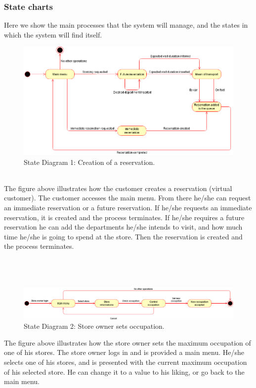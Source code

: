 \subsubsection{State charts}
Here we show the main processes that the system will manage, and the states in which the system will find itself.
\begin{figure}[!htb]
	\centering
	\includegraphics[width=\textwidth]{Images/StateDiagram1.png}
	\caption{\label{fig:metamodel3}State Diagram 1: Creation of a reservation.}
\end{figure}\\
The figure above illustrates how the customer creates a reservation (virtual customer). The customer accesses the main menu. From there he/she can request an immediate reservation or a future reservation. If he/she requests an immediate reservation, it is created and the process terminates. If he/she requires a future reservation he can add the departments he/she intends to visit, and how much time he/she is going to spend at the store. Then the reservation is created and the process terminates.\\\\\\\\

\begin{figure}[!htb]
	\centering
	\includegraphics[width=\textwidth]{Images/StateDiagram2.png}
	\caption{State Diagram 2: Store owner sets occupation.}
\end{figure}
The figure above illustrates how the store owner sets the maximum occupation of one of his stores. The store owner logs in and is provided a main menu. He/she selects one of his stores, and is presented with the current maximum occupation of his selected store. He can change it to a value to his liking, or go back to the main menu.


